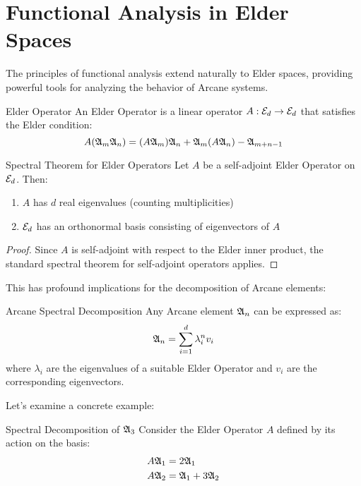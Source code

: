 \section{Functional Analysis in Elder Spaces}

\begin{twocolumnlayout}
The principles of functional analysis extend naturally to Elder spaces, providing powerful tools for analyzing the behavior of Arcane systems.

\begin{definition}{Elder Operator}{}
An Elder Operator is a linear operator $A: \mathcal{E}_{d} \to \mathcal{E}_{d}$ that satisfies the Elder condition:
\begin{equation}
A(\mathfrak{A}_{m}\mathfrak{A}_{n}) = (A\mathfrak{A}_{m})\mathfrak{A}_{n} + \mathfrak{A}_{m}(A\mathfrak{A}_{n}) - \mathfrak{A}_{m+n-1}
\end{equation}
\end{definition}

\begin{theorem}{Spectral Theorem for Elder Operators}{}
Let $A$ be a self-adjoint Elder Operator on $\mathcal{E}_{d}$. Then:
\begin{enumerate}
\item $A$ has $d$ real eigenvalues (counting multiplicities)
\item $\mathcal{E}_{d}$ has an orthonormal basis consisting of eigenvectors of $A$
\end{enumerate}
\end{theorem}

\begin{proof}
Since $A$ is self-adjoint with respect to the Elder inner product, the standard spectral theorem for self-adjoint operators applies.
\end{proof}

This has profound implications for the decomposition of Arcane elements:

\begin{corollary}{Arcane Spectral Decomposition}{}
Any Arcane element $\mathfrak{A}_{n}$ can be expressed as:
\begin{equation}
\mathfrak{A}_{n} = \sum_{i=1}^{d} \lambda_i^n v_i
\end{equation}
where $\lambda_i$ are the eigenvalues of a suitable Elder Operator and $v_i$ are the corresponding eigenvectors.
\end{corollary}

Let's examine a concrete example:

\begin{examplebox}{Spectral Decomposition of $\mathfrak{A}_{3}$}{}
Consider the Elder Operator $A$ defined by its action on the basis:
\begin{align}
A\mathfrak{A}_{1} &= 2\mathfrak{A}_{1} \\
A\mathfrak{A}_{2} &= \mathfrak{A}_{1} + 3\mathfrak{A}_{2}
\end{align}


\end{examplebox}
\end{twocolumnlayout}
